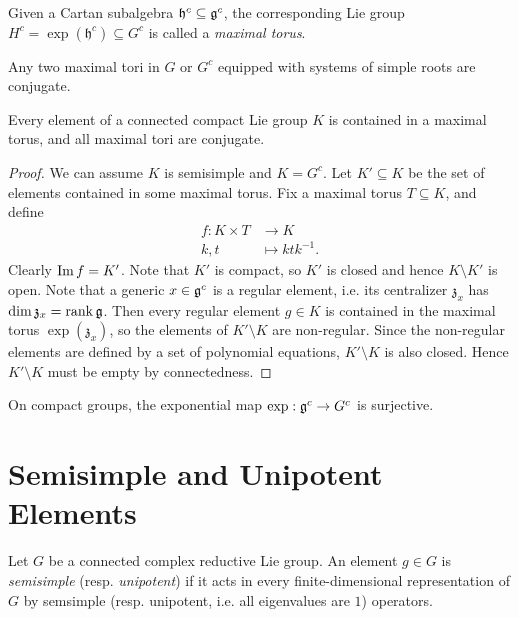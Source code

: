 \begin{definition}
  Given a Cartan subalgebra $\mathfrak{h}^c \subseteq \mathfrak{g}^c$,
  the corresponding Lie group
  $H^c = \exp(\mathfrak{h}^c) \subseteq G^c$
  is called a \emph{maximal torus}.
\end{definition}

\begin{corollary}
  Any two maximal tori in $G$ or $G^c$
  equipped with systems of simple roots
  are conjugate.
\end{corollary}

\begin{theorem}
  Every element of a connected compact
  Lie group $K$ is contained in a maximal
  torus, and all maximal tori are
  conjugate.
\end{theorem}

\begin{proof}
  We can assume $K$ is semisimple and
  $K = G^c$. Let $K' \subseteq K$ be the
  set of elements contained in some
  maximal torus. Fix a maximal torus
  $T \subseteq K$, and define
  \begin{align*}
    f : K \times T
    &\longrightarrow K \\
    k, t &\longmapsto k t k^{-1}.
  \end{align*}
  Clearly $\operatorname{Im} f = K'$. Note that $K'$ is
  compact, so $K'$ is closed and hence
  $K \setminus K'$ is open. Note that a
  generic
  $x \in \mathfrak{g}^c$ is a regular element, i.e. its
  centralizer $\mathfrak{z}_x$ has
  $\dim \mathfrak{z}_x = \operatorname{rank} \mathfrak{g}$.
  Then every regular element $g \in K$ is
  contained in the maximal torus
  $\exp(\mathfrak{z}_x)$, so
  the elements of $K' \setminus K$ are
  non-regular. Since the non-regular
  elements are defined by a set of
  polynomial equations, $K' \setminus K$
  is also closed. Hence $K' \setminus K$
  must be empty by connectedness.
\end{proof}

\begin{corollary}
  On compact groups, the exponential map
  $\exp : \mathfrak{g}^c \to G^c$ is surjective.
\end{corollary}

\section{Semisimple and Unipotent Elements}

\begin{definition}
  Let $G$ be a connected complex reductive
  Lie group.
  An element $g \in G$ is \emph{semisimple}
  (resp. \emph{unipotent})
  if it acts in every finite-dimensional
  representation of $G$ by semsimple
  (resp. unipotent, i.e. all eigenvalues
  are $1$) operators.
\end{definition}

